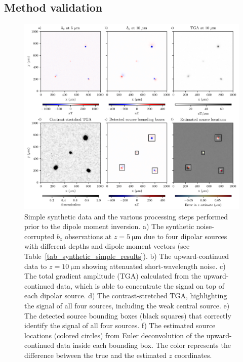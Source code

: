 \subsection{Method validation}

\begin{figure}[tb!]
  \centering
  \includegraphics[width=1\linewidth]{figures/simple-synthetic-data.png}
  \caption{
    Simple synthetic data and the various processing steps performed prior to the dipole moment inversion.
    a) The synthetic noise-corrupted $b_z$ observations at
    $z = \qty{5}{\micro\meter}$ due to four dipolar sources with different
    depths and dipole moment vectors
    (see Table~\ref{tab_synthetic_simple_results}).
    b) The upward-continued data to $z = \qty{10}{\micro\meter}$ showing
    attenuated short-wavelength noise.
    c) The total gradient amplitude (TGA) calculated from the
    upward-continued data, which is able to concentrate the signal on top
    of each dipolar source.
    d) The contrast-stretched TGA, highlighting the signal of all four
    sources, including the weak central source.
    e) The detected source bounding boxes (black squares) that correctly
    identify the signal of all four sources.
    f) The estimated source locations (colored circles) from Euler
    deconvolution of the upward-continued data inside each bounding box.
    The color represents the difference between the true and the estimated
    $z$ coordinates.
  }
  \label{fig_synthetic_simple_data}
\end{figure}

